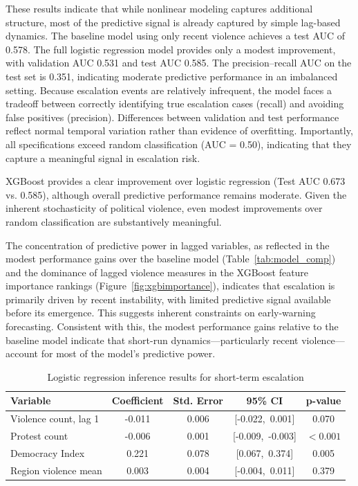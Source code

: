 \documentclass[12pt]{article}
\begin{document}
These results indicate that while nonlinear modeling captures additional structure, most of the predictive signal is already captured by simple lag-based dynamics. The baseline model using only recent violence achieves a test AUC of 0.578. The full logistic regression model provides only a modest improvement, with validation AUC 0.531 and test AUC 0.585. The precision–recall AUC on the test set is 0.351, indicating moderate predictive performance in an imbalanced setting. Because escalation events are relatively infrequent, the model faces a tradeoff between correctly identifying true escalation cases (recall) and avoiding false positives (precision). Differences between validation and test performance reflect normal temporal variation rather than evidence of overfitting. Importantly, all specifications exceed random classification (AUC = 0.50), indicating that they capture a meaningful signal in escalation risk.  

XGBoost provides a clear improvement over logistic regression (Test AUC 0.673 vs. 0.585), although overall predictive performance remains moderate. Given the inherent stochasticity of political violence, even modest improvements over random classification are substantively meaningful.

The concentration of predictive power in lagged variables, as reflected in the modest performance gains over the baseline model (Table~\ref{tab:model_comp}) and the dominance of lagged violence measures in the XGBoost feature importance rankings (Figure~\ref{fig:xgbimportance}), indicates that escalation is primarily driven by recent instability, with limited predictive signal available before its emergence. This suggests inherent constraints on early-warning forecasting. Consistent with this, the modest performance gains relative to the baseline model indicate that short-run dynamics—particularly recent violence—account for most of the model’s predictive power.

\begin{table}[H]
\centering
\caption{Logistic regression inference results for short-term escalation}
\label{tab:logit_inference}
\begin{tabular}{lcccc}
\toprule
Variable & Coefficient & Std. Error & 95\% CI & p-value \\
\midrule
Violence count, lag 1 & -0.011 & 0.006 & [-0.022,\ 0.001] & 0.070 \\
Protest count & -0.006 & 0.001 & [-0.009,\ -0.003] & $<0.001$ \\
Democracy Index & 0.221 & 0.078 & [0.067,\ 0.374] & 0.005 \\
Region violence mean & 0.003 & 0.004 & [-0.004,\ 0.011] & 0.379 \\
\bottomrule
\end{tabular}
\end{table}
\end{document}
